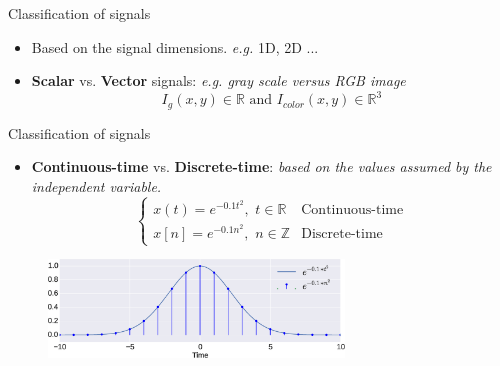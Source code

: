 \documentclass[aspectratio=169]{beamer}
\let\olditem\item
\renewcommand{\item}{\setlength{\itemsep}{\fill}\olditem}
\begin{document}
\begin{frame}[t]
\end{frame}

\begin{frame}{Classification of signals}\
\begin{itemize}
\item Based on the signal dimensions. \textit{e.g.} 1D, 2D ...
\item \textbf{Scalar} vs. \textbf{Vector} signals: \textit{e.g. gray scale versus RGB image}
\[I_g\left(x,y\right) \in \mathbb{R} \,\,\mathrm{and}\,\, I_{color}\left(x,y\right) \in \mathbb{R}^3\]

\end{itemize}
\end{frame}


\begin{frame}[t]
\end{frame}


\begin{frame}{Classification of signals}\
\begin{itemize}
\item \textbf{Continuous-time} vs. \textbf{Discrete-time}: \textit{based on the values assumed by the independent variable.}
\[
\begin{cases}
x(t) = e^{-0.1t^{2}}, \,\, t \in \mathbb{R} & \text{Continuous-time} \\
x[n] = e^{-0.1n^{2}}, \,\, n \in \mathbb{Z} & \text{Discrete-time}
\end{cases}
 \]
\end{itemize}
\begin{figure}
\includegraphics[width=0.7\textwidth]{img/cont_disc.eps}
\end{figure}
\end{frame}



\begin{frame}[t]
\end{frame}
\end{document}
